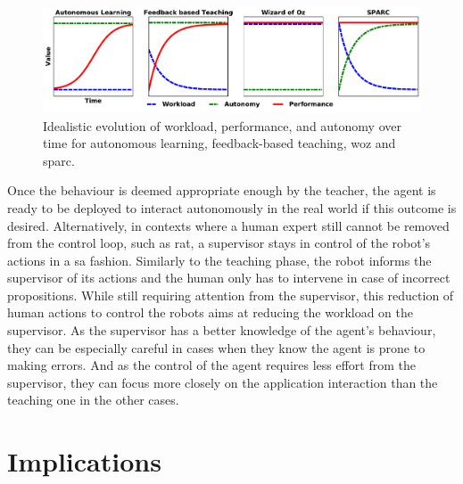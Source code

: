 \begin{figure}[ht]
	\includegraphics[width=1\linewidth]{concept.pdf}
	\centering
	\caption{Idealistic evolution of workload, performance, and autonomy over time for autonomous learning, feedback-based teaching, \gls{woz} and \gls{sparc}.}
	\label{fig:concept}
\end{figure}

Once the behaviour is deemed appropriate enough by the teacher, the agent is ready to be deployed to interact autonomously in the real world if this outcome is desired. Alternatively, in contexts where a human expert still cannot be removed from the control loop, such as \gls{rat}, a supervisor stays in control of the robot's actions in a \gls{sa} fashion. Similarly to the teaching phase, the robot informs the supervisor of its actions and the human only has to intervene in case of incorrect propositions. While still requiring attention from the supervisor, this reduction of human actions to control the robots aims at reducing the workload on the supervisor. As the supervisor has a better knowledge of the agent's behaviour, they can be especially careful in cases when they know the agent is prone to making errors. And as the control of the agent requires less effort from the supervisor, they can focus more closely on the application interaction than the teaching one in the other cases. 

\section{Implications}

